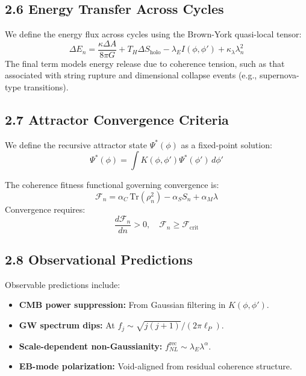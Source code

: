 \subsection{2.6 Energy Transfer Across Cycles}

We define the energy flux across cycles using the Brown-York quasi-local tensor:
\begin{equation}
\Delta E_n = \frac{\kappa \Delta A}{8\pi G} + T_H \Delta S_{\text{holo}} - \lambda_E I(\phi, \phi') + \kappa_\lambda \lambda_n^2
\end{equation}
The final term models energy release due to coherence tension, such as that associated with string rupture and dimensional collapse events (e.g., supernova-type transitions).

\subsection{2.7 Attractor Convergence Criteria}

We define the recursive attractor state \( \Psi^*(\phi) \) as a fixed-point solution:
\begin{equation}
\Psi^*(\phi) = \int K(\phi, \phi') \Psi^*(\phi') \, d\phi'
\end{equation}

The coherence fitness functional governing convergence is:
\begin{equation}
\mathcal{F}_n = \alpha_C \, \text{Tr}(\rho_n^2) - \alpha_S S_n + \alpha_M \lambda
\end{equation}
Convergence requires:
\begin{equation}
\frac{d\mathcal{F}_n}{dn} > 0, \quad \mathcal{F}_n \geq \mathcal{F}_{\text{crit}}
\end{equation}

\subsection{2.8 Observational Predictions}

Observable predictions include:
\begin{itemize}
    \item \textbf{CMB power suppression:} From Gaussian filtering in \( K(\phi, \phi') \).
    \item \textbf{GW spectrum dips:} At \( f_j \sim \sqrt{j(j+1)} / (2\pi \ell_P) \).
    \item \textbf{Scale-dependent non-Gaussianity:} \( f_{NL}^{\text{rec}} \sim \lambda_E \lambda^\alpha \).
    \item \textbf{EB-mode polarization:} Void-aligned from residual coherence structure.
\end{itemize}

